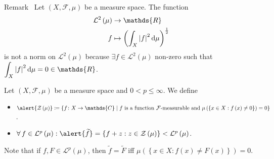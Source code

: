 \begin{frame}
	\begin{block}{Remark~\cite{Liou2013}}
		Let $\left(X,\mathcal{F},\mu\right)$ be a measure space.
		The function
		\begin{align*}
			\mathcal{L}^{2}\left(\mu\right) & \to\mathds{R} \\
			f                               & \mapsto
			{\left(
				\int_{X}{{\left|f\right|}}^{2}\dl\mu
				\right)}^{\frac{1}{2}}
		\end{align*}
		\alert{is not a norm} on $\mathcal{L}^{2}\left(\mu\right)$
		because $\exists f\in\mathcal{L}^{2}\left(\mu\right)$ non-zero
		such that
		\begin{math}
			\displaystyle
			\int_{X}{{\left|f\right|}}^{2}\dl\mu=
			0\in
			\mathds{R}
		\end{math}.
	\end{block}

	\begin{definition}
		Let $\left(X,\mathcal{F},\mu\right)$ be a measure space and
		$0<p\leq\infty$.
		We define
		\begin{itemize}
			\item

			      \begin{math}
				      \alert{\mathcal{Z}\left(\mu\right)}\coloneqq
				      \left\{
				      f\colon X\to\mathds{C}\mid
				      f\text{ is a function $\mathcal{F}$-measurable and }
				      \mu
				      \left(
				      \left\{x\in X:f\left(x\right)\neq0\right\}
				      \right)=
				      0
				      \right\}
			      \end{math}.

			\item

			      \begin{math}
				      \forall f\in\mathcal{L}^{p}\left(\mu\right):
				      \alert{\widetilde{f}}=
				      \left\{
				      f+z:z\in\mathcal{Z}\left(\mu\right)
				      \right\}<
				      \mathcal{L}^{p}\left(\mu\right)
			      \end{math}.
		\end{itemize}
		Note that if $f,F\in\mathcal{L}^{p}\left(\mu\right)$, then
		$\widetilde{f}=\widetilde{F}$ iff
		\begin{math}
			\mu\left(
			\left\{
			x\in X:f\left(x\right)\neq F\left(x\right)
			\right\}
			\right)=0
		\end{math}.
	\end{definition}


\end{frame}

